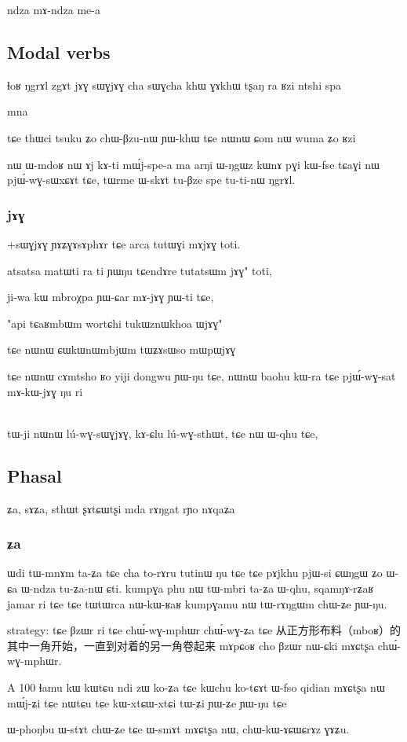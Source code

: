 \documentclass[oldfontcommands,oneside,a4paper,11pt]{article}
\begin{document}
  ndza mɤ-ndza me-a
  
  
  \subsection{Modal verbs}
 ɬoʁ
ŋgrɤl
zgɤt
jɤɣ sɯɣjɤɣ
cha sɯɣcha
khɯ ɣɤkhɯ
tʂaŋ
ra
ʁzi
ntshi
spa

 
mna

tɕe thɯci tsuku ʑo chɯ-βzu-nɯ ɲɯ-khɯ
tɕe nɯnɯ ɕom nɯ wuma ʑo ʁzi

nɯ ɯ-mdoʁ nɯ ɤj kɤ-ti mɯ́j-spe-a ma arŋi ɯ-ŋgɯz kɯnɤ pɣi kɯ-fse
tɕaɣi nɯ pjɯ́-wɣ-sɯxɕɤt tɕe, tɯrme ɯ-skɤt tu-βze spe tu-ti-nɯ ŋgrɤl.


 \subsubsection{jɤɣ}
 +sɯɣjɤɣ
 ɲɤʑɣɤsɤphɤr tɕe arca tutɯɣi mɤjɤɣ toti.

atsatsa matɯti ra ti ɲɯŋu
tɕendɤre tutatsɯm jɤɣ" toti,

ji-wa kɯ mbroχpa ɲɯ-ɕar mɤ-jɤɣ ɲɯ-ti tɕe,

"api tɕaʁmbɯm wortɕhi tukɯznɯkhoa ɯjɤɣ"

tɕe nɯnɯ ɕɯkɯnɯmbjɯm tɯʑɤsɯso mɯpɯjɤɣ

tɕe nɯnɯ cɤmtsho ʁo yiji dongwu ɲɯ-ŋu tɕe, nɯnɯ
baohu kɯ-ra tɕe pjɯ́-wɣ-sat mɤ-kɯ-jɤɣ ŋu ri

\\
tɯ-ji nɯnɯ lú-wɣ-sɯɣjɤɣ, kɤ-ɕlu lú-wɣ-sthɯt, tɕe nɯ ɯ-qhu tɕe,
\subsection{Phasal}
ʑa, sɤʑa, sthɯt ʂɤtɕɯtʂi mda rɤŋgat rɲo
nɤqaʑa
\subsubsection{ʑa}
 ɯdi tɯ-mnɤm ta-ʑa tɕe cha to-rɤru tutinɯ ŋu tɕe
tɕe pɤjkhu pjɯ-si ɕɯŋgɯ ʑo ɯ-ɕa ɯ-ndza tu-ʑa-nɯ ɕti.
kumpɣa phu nɯ tɯ-mbri ta-ʑa ɯ-qhu, 
sqamŋɤ-rʑaʁ jamar ri tɕe tɕe tɯtɯrca nɯ-kɯ-ʁaʁ kumpɣamu nɯ tɯ-rɤŋgɯm chɯ-ʑe ɲɯ-ŋu.

strategy:
tɕe βzɯr ri tɕe chɯ́-wɣ-mphɯr chɯ́-wɣ-ʑa tɕe 从正方形布料（mboʁ）的其中一角开始，一直到对着的另一角卷起来
mɤpɕoʁ cho βzɯr nɯ-ɕki mɤɕtʂa chɯ́-wɣ-mphɯr.

A	100	ɬamu	kɯ	kɯtɕu	ndi	zɯ	ko-ʑa	tɕe	kɯchu	ko-tɕɤt
ɯ-fso qidian mɤɕtʂa nɯ mɯ́j-ʑi
tɕe nɯtɕu tɕe kɯ-xtɕɯ-xtɕi tɯ-ʑi ɲɯ-ʑe ɲɯ-ŋu tɕe

ɯ-phoŋbu ɯ-stɤt chɯ-ʑe tɕe ɯ-smɤt mɤɕtʂa nɯ,
chɯ-kɯ-ɤɕɯɕrɤz ɣɤʑu.
\end{document}
